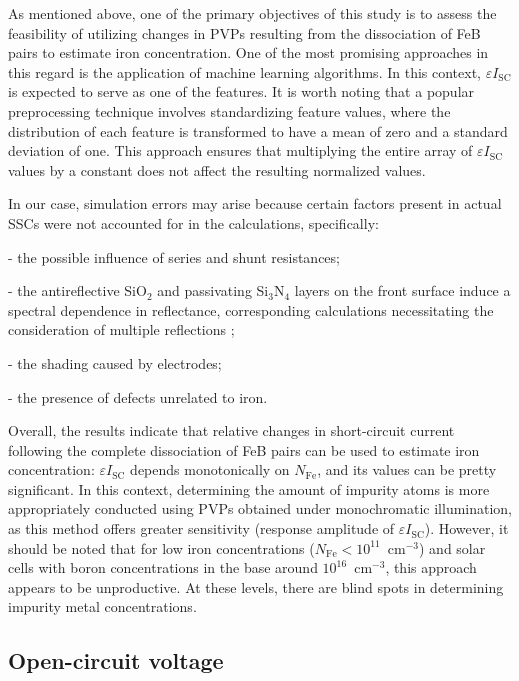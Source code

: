 \documentclass[a4paper,fleqn]{cas-sc}
\begin{document}
As mentioned above, one of the primary objectives of this study is to assess the feasibility of utilizing
changes in PVPs resulting from the dissociation of FeB pairs to estimate iron concentration.
One of the most promising approaches in this regard is the application of machine learning algorithms.
In this context, $\varepsilon I_\mathrm{SC}$ is expected to serve as one of the features.
It is worth noting that a popular preprocessing technique involves standardizing feature values,
where the distribution of each feature is transformed to have a mean of zero and a standard deviation of one.
This approach ensures that multiplying the entire array of $\varepsilon I_\mathrm{SC}$ values by a constant does not affect the resulting normalized values.

In our case, simulation errors may arise because certain factors present in actual SSCs were not accounted for in the calculations, specifically:

\noindent
- the possible influence of series and shunt resistances;

\noindent
- the antireflective SiO$_2$ and passivating Si$_3$N$_4$ layers on the front surface induce a spectral dependence in reflectance, corresponding calculations necessitating the consideration of multiple reflections \cite{KostRefl2000};

\noindent
- the shading caused by electrodes;

\noindent
- the presence of defects unrelated to iron.


Overall, the results indicate that relative changes in short-circuit current following the complete dissociation of FeB pairs
can be used to estimate iron concentration:
$\varepsilon I_\mathrm{SC}$ depends monotonically on $N_\mathrm{Fe}$, and its values can be pretty significant.
In this context, determining the amount of impurity atoms is more appropriately conducted
using PVPs obtained under monochromatic illumination,
as this method offers greater sensitivity (response amplitude of $\varepsilon I_\mathrm{SC}$).
However, it should be noted that for low iron concentrations ($N_\mathrm{Fe}<10^{11}$~cm$^{-3}$)
and solar cells with boron concentrations in the base around $10^{16}$~cm$^{-3}$,
this approach appears to be unproductive.
At these levels, there are blind spots in determining impurity metal concentrations.


\subsection{Open-circuit voltage}
\end{document}
